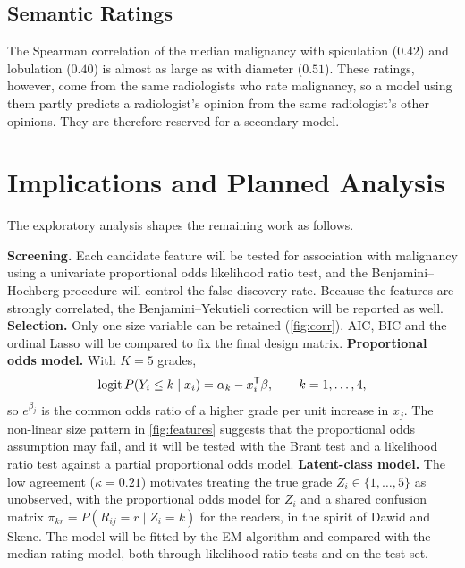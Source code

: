 \documentclass[12pt]{article}
\begin{document}
\subsection{Semantic Ratings}

The Spearman correlation of the median malignancy with
spiculation ($0.42$) and lobulation ($0.40$) is almost as large as
with diameter ($0.51$). These ratings, however, come from the same
radiologists who rate malignancy, so a model using them partly
predicts a radiologist's opinion from the same radiologist's
other opinions. They are therefore reserved for a secondary
model.

\section{Implications and Planned Analysis}
\label{sec:plan}

The exploratory analysis shapes the remaining work as follows.
\begin{enumerate}
  \ii \textbf{Screening.} Each candidate feature will be tested for
    association with malignancy using a univariate proportional
    odds likelihood ratio test, and the Benjamini--Hochberg
    procedure\cite{benjamini1995} will control the false discovery
    rate. Because the features are strongly correlated, the
    Benjamini--Yekutieli correction will be reported as well.
  \ii \textbf{Selection.} Only one size variable can be retained
    (\cref{fig:corr}). AIC, BIC and the ordinal Lasso will be
    compared to fix the final design matrix.
  \ii \textbf{Proportional odds model.} With $K=5$ grades,
    \[
      \operatorname{logit} P(Y_i \le k \mid x_i) = \alpha_k -
      x_i^{\mathsf{T}}\beta, \qquad k = 1,\dots,4,
    \]
    so $e^{\beta_j}$ is the common odds ratio of a higher grade per
    unit increase in $x_j$. The non-linear size pattern in
    \cref{fig:features} suggests that the proportional odds
    assumption may fail, and it will be tested with the Brant
    test\cite{brant1990} and a likelihood ratio test against a
    partial proportional odds model.
  \ii \textbf{Latent-class model.} The low agreement
    ($\kappa = 0.21$) motivates treating the true grade
    $Z_i \in \{1,\dots,5\}$ as unobserved, with the proportional
    odds model for $Z_i$ and a shared confusion matrix
    $\pi_{kr} = P(R_{ij} = r \mid Z_i = k)$ for the readers, in the
    spirit of Dawid and Skene\cite{dawid1979}. The model will be
    fitted by the EM algorithm and compared with the median-rating
    model, both through likelihood ratio tests and on the test set.
\end{enumerate}
\end{document}
